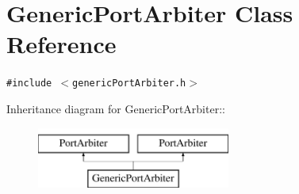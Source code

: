\hypertarget{classGenericPortArbiter}{
\section{GenericPortArbiter Class Reference}
\label{classGenericPortArbiter}
}
{\tt \#include $<$genericPortArbiter.h$>$}

Inheritance diagram for GenericPortArbiter::\begin{figure}[H]
\begin{center}
\leavevmode
\includegraphics[height=2cm]{classGenericPortArbiter}
\end{center}
\end{figure}
